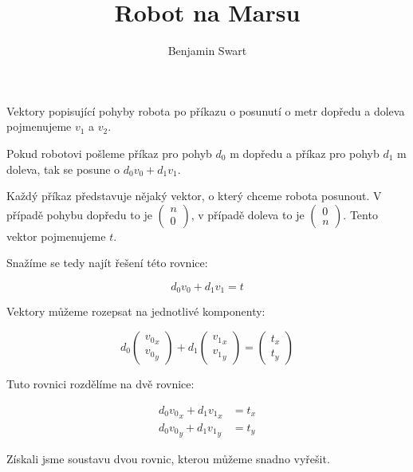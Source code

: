 \documentclass{article}
\title{Robot na Marsu}
\author{Benjamin Swart}
\begin{document}
Vektory popisující pohyby robota po příkazu o posunutí o metr dopředu a doleva pojmenujeme $v_1$ a $v_2$.

Pokud robotovi pošleme příkaz pro pohyb $d_0$ \si{\meter} dopředu a příkaz pro pohyb $d_1$ \si{\meter} doleva, tak se posune o $d_0 v_0 + d_1 v_1$.

Každý příkaz představuje nějaký vektor, o který chceme robota posunout. V případě pohybu dopředu to je $\begin{pmatrix} n \\ 0 \end{pmatrix}$, v případě doleva to je $\begin{pmatrix} 0 \\ n \end{pmatrix}$. Tento vektor pojmenujeme $t$.

Snažíme se tedy najít řešení této rovnice:

\begin{equation*}
    d_0 v_0 + d_1 v_1 = t
\end{equation*}

Vektory můžeme rozepsat na jednotlivé komponenty:

\begin{equation*}
    d_0 \begin{pmatrix}
        {v_0}_x \\
        {v_0}_y
    \end{pmatrix} + d_1 \begin{pmatrix}
        {v_1}_x \\
        {v_1}_y
    \end{pmatrix} = \begin{pmatrix}
        t_x \\
        t_y
    \end{pmatrix}
\end{equation*}

Tuto rovnici rozdělíme na dvě rovnice:

\begin{align*}
    d_0 {v_0}_x + d_1 {v_1}_x & = t_x \\
    d_0 {v_0}_y + d_1 {v_1}_y & = t_y
\end{align*}

Získali jsme soustavu dvou rovnic, kterou můžeme snadno vyřešit.
\end{document}
